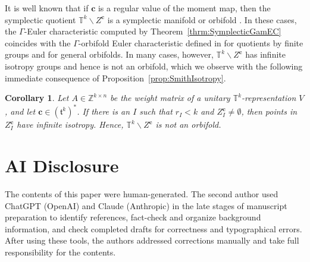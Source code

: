 \documentclass[twoside]{amsart}
\newtheorem{corollary}[theorem]{Corollary}
\theoremstyle{definition}
\theoremstyle{remark}
\numberwithin{equation}{section}
\newcommand{\T}{\mathbb{T}}
\newcommand{\Z}{\mathbb{Z}}
\begin{document}
It is well known that if $\mathbf{c}$ is a regular value of the moment map, then the symplectic quotient $\T^k\backslash Z^{\mathbf{c}}$
is a symplectic manifold or orbifold \cite{MarsdenWeinsteinReduction,MeyerReduction}. In these cases, the $\Gamma$-Euler characteristic
computed by Theorem~\ref{thrm:SymplecticGamEC} coincides with the $\Gamma$-orbifold Euler characteristic defined in
\cite{TamanoiMorava,TamanoiCovering} for quotients by finite groups and \cite[Sec.~4]{FarsiSeaGenOrbEuler} for general orbifolds.
In many cases, however, $\T^k\backslash Z^{\mathbf{c}}$ has infinite isotropy groups and hence is not an orbifold, which we
observe with the following immediate consequence of Proposition~\ref{prop:SmithIsotropy}.

\begin{corollary}
\label{cor:SymplecticNotOrbifolds}
Let $A\in\Z^{k\times n}$ be the weight matrix of a unitary $\T^k$-representation $V$, and
let $\mathbf{c}\in (\mathfrak{t}^k)^\ast$. If there is an $I$ such that $r_I < k$ and $Z_I^{\mathbf{c}}\neq\emptyset$,
then points in $Z_I^{\mathbf{c}}$ have infinite isotropy. Hence, $\T^k\backslash Z^{\mathbf{c}}$ is not an orbifold.
\end{corollary}


\section*{AI Disclosure}

The contents of this paper were human-generated. The second author used ChatGPT (OpenAI) and Claude (Anthropic) in the late stages of manuscript preparation
to identify references, fact-check and organize background information, and check completed drafts for correctness and typographical errors.
After using these tools, the authors addressed corrections manually and take full responsibility for the contents.






\end{document}
